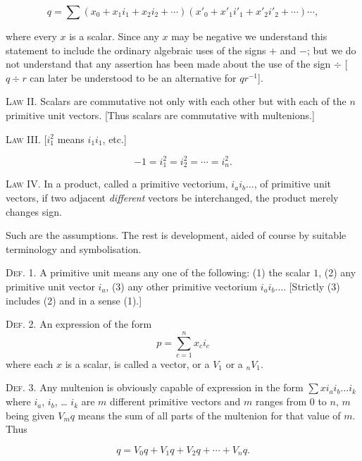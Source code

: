 \documentclass[11pt]{article}
\begin{document}
\begin{equation}
q = \sum (x_0+x_1i_1+x_2i_2+\cdots)(x'_0+x'_1i'_1+x'_2i'_2+\cdots)\cdots,
\tag{1}
\end{equation}

where every $x$ is a scalar. Since any $x$ may be negative we understand this
statement to include the ordinary algebraic uses of the signs $+$ and $-$; but
we do not understand that any assertion has been made about the use of the sign
$\div$ [$q\div r$ can later be understood to be an alternative for $qr^{-1}$].

\noindent\textsc{Law II.} Scalars are commutative not only with each other but
with each of the $n$ primitive unit vectors. [Thus scalars are commutative with
multenions.]

\begin{center}
  \textsc{Law III.} [$i_1^2$ means $i_1i_1$, etc.]
\end{center}
\begin{equation*}
  -1=i_1^2=i_2^2=\cdots=i_n^2.
\end{equation*}

\noindent\textsc{Law IV.} In a product, called a primitive vectorium,
$i_ai_b\ldots$, of primitive unit vectors, if two adjacent \emph{different}
vectors be interchanged, the product merely changes sign.

\indent Such are the assumptions. The rest is development, aided of course by
suitable terminology and symbolisation.

\noindent\textsc{Def. 1.} A primitive unit means any one of the following:
(1) the scalar $1$, (2) any primitive unit vector $i_a$, (3) any other
primitive vectorium $i_ai_b\ldots$. [Strictly (3) includes (2) and in a sense
(1).]

\noindent\textsc{Def. 2.} An expression of the form
\nopagebreak[4]
\begin{equation*}
  p=\sum_{c=1}^{n}x_ci_c
\end{equation*}
where each $x$ is a scalar, is called a vector, or a $V_1$ or a ${}_nV_1$.

\noindent\textsc{Def. 3.} Any multenion is obviously capable of expression in
the form $\sum xi_ai_b\ldots i_k$ where $i_a$, $i_b$, \ldots{} $i_k$ are $m$
different primitive vectors and $m$ ranges from $0$ to $n$, $m$ being given
$V_mq$ means the sum of all parts of the multenion for that value of $m$. Thus

\begin{equation*}
  q=V_0q+V_1q+V_2q+\cdots+V_nq.
\end{equation*}
\end{document}
